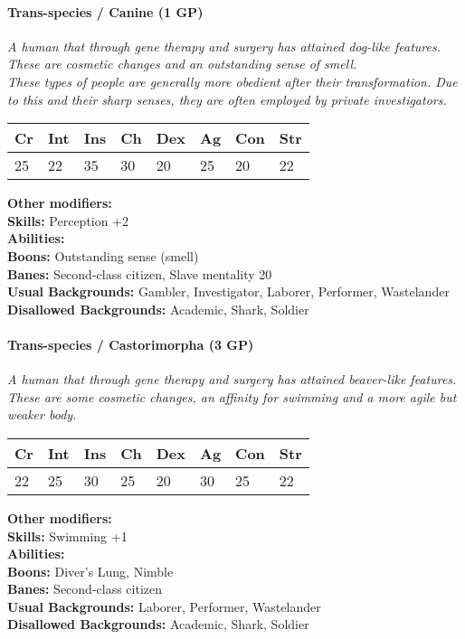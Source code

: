 \documentclass[12pt,a4paper,openany]{book}
\begin{document}
	\hrulefill
	\paragraph*{Trans-species / Canine (1 GP)}
	\textit{A human that through gene therapy and surgery has attained dog-like features. These are cosmetic changes and an outstanding sense of smell.\\
	These types of people are generally more obedient after their transformation. Due to this and their sharp senses, they are often employed by private investigators.}\par
	\begin{tabular}{|l|l|l|l|l|l|l|l|}
		\hline
		Cr & Int & Ins & Ch & Dex & Ag & Con & Str \\ \hline
		25 & 22 & 35 & 30 & 20 & 25 & 20 & 22 \\ \hline
	\end{tabular}\par
	\noindent\textbf{Other modifiers:} \\
	\textbf{Skills:} Perception +2\\
	\textbf{Abilities:} \\
	\textbf{Boons:} Outstanding sense (smell)\\
	\textbf{Banes:} Second-class citizen, Slave mentality 20\\
	\textbf{Usual Backgrounds:} Gambler, Investigator, Laborer, Performer, Wastelander\\
	\textbf{Disallowed Backgrounds:} Academic, Shark, Soldier
	
	\hrulefill
	\paragraph*{Trans-species / Castorimorpha (3 GP)}
	\textit{A human that through gene therapy and surgery has attained beaver-like features. These are some cosmetic changes, an affinity for swimming and a more agile but weaker body.}\par
	\begin{tabular}{|l|l|l|l|l|l|l|l|}
		\hline
		Cr & Int & Ins & Ch & Dex & Ag & Con & Str \\ \hline
		22 & 25 & 30 & 25 & 20 & 30 & 25 & 22 \\ \hline
	\end{tabular}\par
	\noindent\textbf{Other modifiers:} \\
	\textbf{Skills:} Swimming +1\\
	\textbf{Abilities:} \\
	\textbf{Boons:} Diver's Lung, Nimble\\
	\textbf{Banes:} Second-class citizen\\
	\textbf{Usual Backgrounds:} Laborer, Performer, Wastelander\\
	\textbf{Disallowed Backgrounds:} Academic, Shark, Soldier
	
\end{document}
